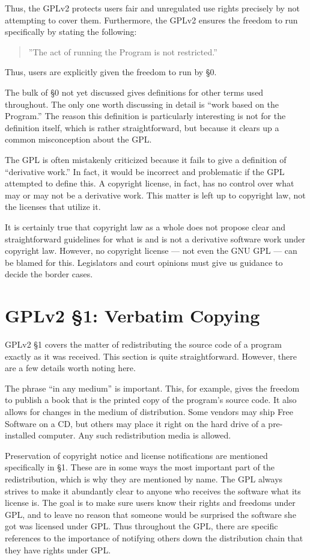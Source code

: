 Thus, the GPLv2 protects users fair and unregulated use rights precisely by
not attempting to cover them. Furthermore, the GPLv2 ensures the freedom
to run specifically by stating the following:
\begin{quote}
''The act of running the Program is not restricted.''
\end{quote}
Thus, users are explicitly given the freedom to run by \S 0.

\medskip

The bulk of \S 0 not yet discussed gives definitions for other terms used
throughout. The only one worth discussing in detail is ``work based on
the Program.''  The reason this definition is particularly interesting is
not for the definition itself, which is rather straightforward, but
because it clears up a common misconception about the GPL\@.

The GPL is often mistakenly criticized because it fails to give a
definition of ``derivative work.''  In fact, it would be incorrect and
problematic if the GPL attempted to define this. A copyright license, in
fact, has no control over what may or may not be a derivative work. This
matter is left up to copyright law, not the licenses that utilize it.

It is certainly true that copyright law as a whole does not propose clear
and straightforward guidelines for what is and is not a derivative
software work under copyright law. However, no copyright license --- not
even the GNU GPL --- can be blamed for this. Legislators and court
opinions must give us guidance to decide the border cases.

\section{GPLv2 \S 1: Verbatim Copying}
\label{GPLs1}

GPLv2 \S 1 covers the matter of redistributing the source code of a program
exactly as it was received. This section is quite straightforward.
However, there are a few details worth noting here.

The phrase ``in any medium'' is important. This, for example, gives the
freedom to publish a book that is the printed copy of the program's source
code. It also allows for changes in the medium of distribution. Some
vendors may ship Free Software on a CD, but others may place it right on
the hard drive of a pre-installed computer. Any such redistribution media
is allowed.

Preservation of copyright notice and license notifications are mentioned
specifically in \S 1. These are in some ways the most important part of
the redistribution, which is why they are mentioned by name. The GPL
always strives to make it abundantly clear to anyone who receives the
software what its license is. The goal is to make sure users know their
rights and freedoms under GPL, and to leave no reason that someone would be
surprised the software she got was licensed under GPL\@. Thus
throughout the GPL, there are specific references to the importance of
notifying others down the distribution chain that they have rights under
GPL.

